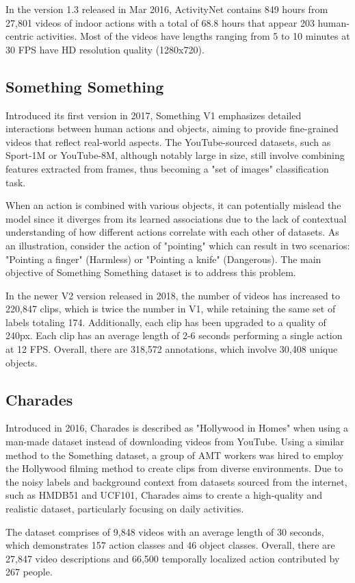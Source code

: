 \documentclass[a4paper]{article}
\begin{document}
In the version 1.3 released in Mar 2016, ActivityNet contains 849 hours from 27,801 videos of indoor actions with a total of 68.8 hours that appear 203 human-centric activities. Most of the videos have lengths ranging from 5 to 10 minutes at 30 FPS have HD resolution quality (1280x720). 
\subsection{Something Something}
Introduced its first version in 2017, Something V1 emphasizes detailed interactions between human actions and objects, aiming to provide fine-grained videos that reflect real-world aspects. The YouTube-sourced datasets, such as Sport-1M or YouTube-8M, although notably large in size, still involve combining features extracted from frames, thus becoming a "set of images" classification task.

When an action is combined with various objects, it can potentially mislead the model since it diverges from its learned associations due to the lack of contextual understanding of how different actions correlate with each other of datasets. As an illustration, consider the action of "pointing" which can result in two scenarios: "Pointing a finger" (Harmless) or "Pointing a knife" (Dangerous). The main objective of Something Something dataset is to address this problem.

In the newer V2 version released in 2018, the number of videos has increased to 220,847 clips, which is twice the number in V1, while retaining the same set of labels totaling 174. Additionally, each clip has been upgraded to a quality of 240px. Each clip has an average length of 2-6 seconds performing a single action at 12 FPS. Overall, there are 318,572 annotations, which involve 30,408 unique objects. 
\subsection{Charades}
Introduced in 2016, Charades is described as "Hollywood in Homes" when using a man-made dataset instead of downloading videos from YouTube. Using a similar method to the Something dataset, a group of AMT workers was hired to employ the Hollywood filming method to create clips from diverse environments. Due to the noisy labels and background context from datasets sourced from the internet, such as HMDB51 and UCF101, Charades aims to create a high-quality and realistic dataset, particularly focusing on daily activities.

The dataset comprises of 9,848 videos with an average length of 30 seconds, which demonstrates 157 action classes and 46 object classes. Overall, there are 27,847 video descriptions and 66,500 temporally localized action contributed by 267 people.
\end{document}
